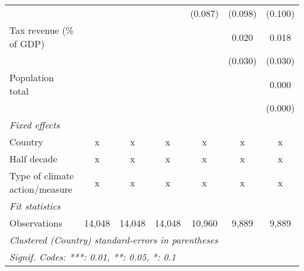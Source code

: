 \begin{tabular}{lcccccc}
                                                                                        &         &         &         & (0.087) & (0.098) & (0.100)\\   
   Tax revenue (\% of GDP)                                                              &         &         &         &         & 0.020   & 0.018\\   
                                                                                        &         &         &         &         & (0.030) & (0.030)\\   
   Population total                                                                     &         &         &         &         &         & 0.000\\   
                                                                                        &         &         &         &         &         & (0.000)\\   
   \emph{Fixed effects}\\
   Country                                                                              & x       & x       & x       & x       & x       & x\\  
   Half decade                                                                          & x       & x       & x       & x       & x       & x\\  
   Type of climate action/measure                                                       & x       & x       & x       & x       & x       & x\\  
   \midrule \emph{Fit statistics}\\
   Observations                                                                         & 14,048  & 14,048  & 14,048  & 10,960  & 9,889   & 9,889\\  
   \midrule
   \multicolumn{7}{l}{\emph{Clustered (Country) standard-errors in parentheses}}\\
   \multicolumn{7}{l}{\emph{Signif. Codes: ***: 0.01, **: 0.05, *: 0.1}}\\
\end{tabular}
\par\endgroup


